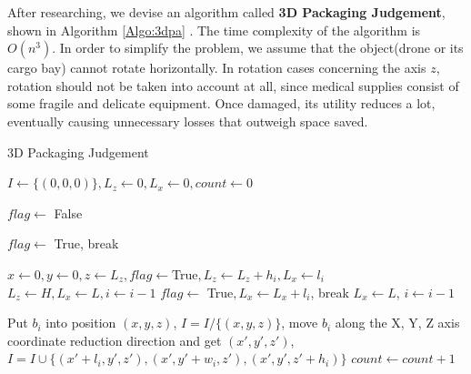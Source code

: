 \documentclass{mcmthesis}
\begin{document}
After researching, we devise an algorithm called \textbf{3D Packaging Judgement}, shown in Algorithm \ref{Algo:3dpa} \cite{Packing}. The time complexity of the algorithm is $O(n^3)$. In order to simplify the problem, we assume that the object(drone or its cargo bay) cannot rotate horizontally. In rotation cases concerning the axis $z$, rotation should not be taken into account at all, since medical supplies consist of some fragile and delicate equipment. Once damaged, its utility reduces a lot, eventually causing unnecessary losses that outweigh space saved.

\begin{algorithm}[h]
\caption{3D Packaging Judgement}\label{Algo:3dpa}
$I\leftarrow\{(0,0,0)\}, L_z \leftarrow 0, L_x 
\leftarrow 0,count\leftarrow 0$\;
  
{  
    $flag \leftarrow$ False\;
    
    {
        {
            $flag \leftarrow$ True, break}
        {
            {
                {
                    $x\leftarrow 0,y\leftarrow 0,z\leftarrow L_z,flag\leftarrow$True$,L_z\leftarrow L_z+h_i,L_x\leftarrow l_i$\;
                }
                {
                    $L_z\leftarrow H,L_x\leftarrow L,i\leftarrow i-1$\;
                }
            }
            \Else
            {
                {
                    {
                        $flag\leftarrow$ True$,L_x\leftarrow L_x+l_i$, break\;
                    }
                }
                {
                    $L_x\leftarrow L$, $i\leftarrow i-1$\;
                }
            }
            
        }
        {
            Put $b_i$ into position $(x,y,z)$, $I=I/\{(x,y,z)\}$, move $b_i$ along the X, Y, Z axis coordinate reduction direction and get $(x',y',z')$, $I=I\cup \{(x'+l_i,y',z'),(x',y'+w_i,z'),(x',y',z'+h_i)\}$\;
            $count \leftarrow count + 1$ 
        }
    }
}
\end{algorithm}  
\end{document}
